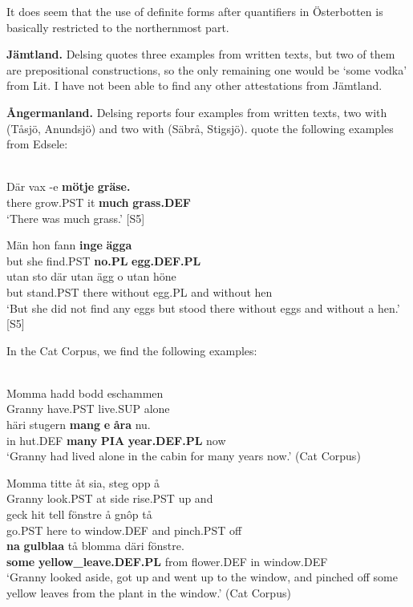 \z

It does seem that the use of definite forms after quantifiers in Österbotten is basically restricted to the northernmost part.

\textbf{Jämtland. }Delsing quotes three examples from written texts, but two of them are prepositional constructions, so the only remaining one would be  ‘some vodka’ from Lit. I have not been able to find any other attestations from Jämtland.

\textbf{Ångermanland.} Delsing reports four examples from written texts, two with  (Tåsjö, Anundsjö) and two with (Säbrå, Stigsjö). \citet{WälchliEtAl1998} quote the following examples from Edsele:

\ea\label{}
\\
\gll Där  vax  {}-e  \textbf{mötje} \textbf{  gräse.}\\
there  grow.PST  it  \textbf{much} \textbf{grass.DEF}\\
\glt ‘There was much grass.’ [S5]

\z

\ea
\gll Män  hon  fann  \textbf{inge} \textbf{ägga}\\
but  she  find.PST  \textbf{no.PL} \textbf{egg.DEF.PL}\\
\gll utan  sto  där  utan  ägg  o  utan  höne\\
but  stand.PST  there  without  egg.PL  and  without  hen\\
\glt ‘But she did not find any eggs but stood there without eggs and without a hen.’ [S5]

\z

In the Cat Corpus, we find the following examples:

\ea\label{}
\\
\gll Momma  hadd  bodd  eschammen\\
Granny  have.PST  live.SUP  alone\\
\gll häri  stugern  \textbf{mang} \textbf{  e} \textbf{  åra} nu.\\
in  hut.DEF  \textbf{many} \textbf{PIA} \textbf{year.DEF.PL} now\\
\glt ‘Granny had lived alone in the cabin for many years now.’ (Cat Corpus)

\z

\ea
\gll Momma  titte  åt  sia,   steg  opp  å\\
Granny  look.PST  at  side  rise.PST  up  and\\
\gll geck  hit  tell  fönstre  å  gnôp  tå\\
go.PST  here  to  window.DEF  and  pinch.PST  off\\
\gll \textbf{na} \textbf{  gulblaa} tå  blomma  däri  fönstre.\\
\textbf{some} \textbf{yellow\_leave.DEF.PL} from  flower.DEF  in  window.DEF\\
\glt ‘Granny looked aside, got up and went up to the window, and pinched off some yellow leaves from the plant in the window.’ (Cat Corpus)

